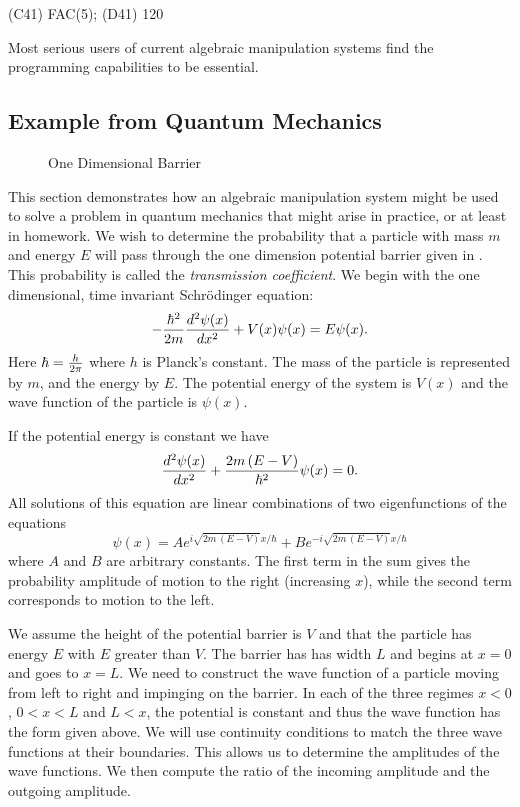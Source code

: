 \begin{code}
(C41) FAC(5);
(D41)                                120
\end{code}
Most serious users of current algebraic manipulation systems find the
programming capabilities to be essential.


\subsection{Example from Quantum Mechanics}
\label{Quantum:Ex:Sec}

\begin{figure}
\begin{center}
\end{center}
\caption{One Dimensional Barrier\label{QMBarrier:Fig}}
\end{figure}

This section demonstrates how an algebraic manipulation system might
be used to solve a problem in quantum mechanics that might arise in
practice, or at least in homework.  We wish to determine the
probability that a particle with mass $m$ and energy $E$ will pass
through the one dimension potential barrier given in
.  This probability is called the {\em
transmission coefficient\/}.  We begin with the one dimensional, time
invariant Schr\"odinger equation:
\[
-{\hbar^2 \over 2 m} {d^2 \psi(x) \over dx^2} + V(x) \psi(x) = E
\psi(x).
\]
Here $\hbar = {h \over 2 \pi}$ where $h$ is Planck's constant.  The
mass of the particle is represented by $m$, and the energy by $E$.
The potential energy of the system is $V(x)$ and the wave function of
the particle is $\psi(x)$.

If the potential energy is constant we have
\[
{d^2 \psi(x) \over dx^2} + {2 m\,(E - V) \over \hbar^2} \psi(x) = 0.
\]
All solutions of this equation are linear combinations of two eigenfunctions
of the equations
\[
\psi(x) =  A e^{i \sqrt{2m\,(E - V)} x/ \hbar} + B e^{- i \sqrt{2m\,(E
- V)} x/ \hbar} 
\]
where $A$ and $B$ are arbitrary constants.  The first term in the sum gives
the probability amplitude of motion to the right (increasing $x$), while the
second term corresponds to motion to the left.  

We assume the height of the potential barrier is $V$ and that the
particle has energy $E$ with $E$ greater than $V$.
The barrier has has width $L$ and begins at $x=0$ and goes to
$x=L$.  We need to construct the wave function of a particle moving from
left to right and impinging on the barrier.  In each of the three regimes
$x<0$, $0<x<L$ and $L<x$, the potential is constant and thus the wave
function has the form given above.  We will use continuity conditions to
match the three wave functions at their boundaries.  This allows us to
determine the amplitudes of the wave functions.  We then compute the ratio
of the incoming amplitude and the outgoing amplitude.


